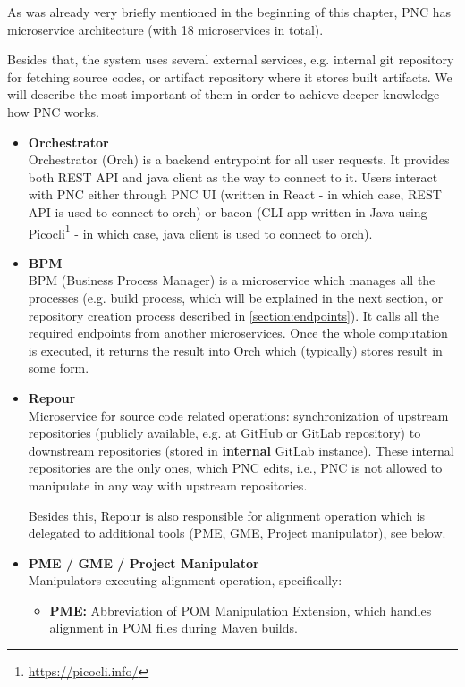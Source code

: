 \documentclass[../main.tex]{subfiles}
\begin{document}
As was already very briefly mentioned in the beginning of this chapter, PNC has microservice architecture (with 18 microservices in total).

Besides that, the system uses several external services, e.g. internal git repository for fetching source codes, or artifact repository where it stores built artifacts. We will describe the most important of them in order to achieve deeper knowledge how PNC works.

\begin{itemize}
    \item \textbf{Orchestrator}\\
    Orchestrator (Orch) is a backend entrypoint for all user requests. It provides both REST API and java client as the way to connect to it. Users interact with PNC either through PNC UI (written in React - in which case, REST API is used to connect to orch) or bacon (CLI app written in Java using Picocli\footnote{\url{https://picocli.info/}} - in which case, java client is used to connect to orch).

    \item \textbf{BPM}\\
    BPM (Business Process Manager) is a microservice which manages all the processes (e.g. build process, which will be explained in the next section, or repository creation process described in \ref{section:endpoints}). It calls all the required endpoints from another microservices. Once the whole computation is executed, it returns the result into Orch which (typically) stores result in some form.

    \item \textbf{Repour}\\
    Microservice for source code related operations: synchronization of upstream repositories (publicly available, e.g. at GitHub or GitLab repository) to downstream repositories (stored in \textbf{internal} GitLab instance). These internal repositories are the only ones, which PNC edits, i.e., PNC is not allowed to manipulate in any way with upstream repositories.
    
    Besides this, Repour is also responsible for alignment operation which is delegated to additional tools (PME, GME, Project manipulator), see below.

    \item \textbf{PME / GME / Project Manipulator}\\
    Manipulators executing alignment operation, specifically:
    \begin{itemize}
        \item \textbf{PME:} Abbreviation of POM Manipulation Extension, which handles alignment in POM files during Maven builds.


\end{itemize}
\end{itemize}
\end{document}
